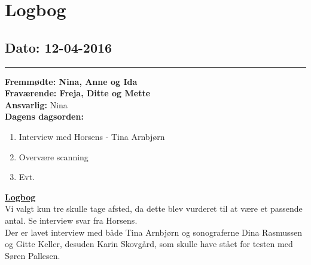 \chapter{Logbog}
\section{Dato: 12-04-2016}
\hrule
\textbf{Fremmødte: Nina, Anne og Ida} \\
\textbf{Fraværende: Freja, Ditte og Mette } \\
\textbf{Ansvarlig: }Nina  \\
\textbf{Dagens dagsorden: }
\begin{enumerate}
	\item Interview med Horsens - Tina Arnbjørn
	\item Overvære scanning
	\item Evt. 
\end{enumerate}

\underline{\textbf{Logbog}}\\
Vi valgt kun tre skulle tage afsted, da dette blev vurderet til at være et passende antal.
Se interview svar fra Horsens.\\
Der er lavet interview med både Tina Arnbjørn og sonograferne Dina Rasmussen og Gitte Keller, desuden Karin Skovgård, som skulle have stået for testen med Søren Pallesen.